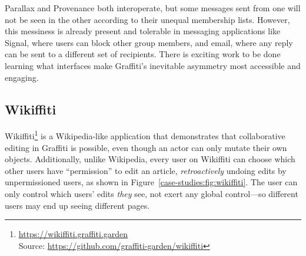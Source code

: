 
Parallax and Provenance both interoperate,
but some messages sent from one will not be seen in the other
according to their unequal membership lists. However, this messiness is already present and tolerable
in messaging applications like Signal, where users can block other group members,
and email, where any reply can be sent to a different set of recipients.
There is exciting work to be done learning what interfaces make
Graffiti's inevitable asymmetry most accessible and engaging.




\subsection{Wikiffiti}
\label{case-studies:wikiffiti}

Wikiffiti\footnote{
\url{https://wikiffiti.graffiti.garden}\\Source: \url{https://github.com/graffiti-garden/wikiffiti}
} is a Wikipedia-like application that demonstrates that
collaborative editing in Graffiti is possible,
even though an actor can only mutate their own objects.
Additionally, unlike Wikipedia,
every user on Wikiffiti can choose which other users have ``permission'' to edit an article,
\emph{retroactively} undoing edits by unpermissioned users,
as shown in Figure~\ref{case-studies:fig:wikiffiti}.
The user can only control which users' edits \emph{they} see, not exert any global control---so different users may end up seeing different pages.

